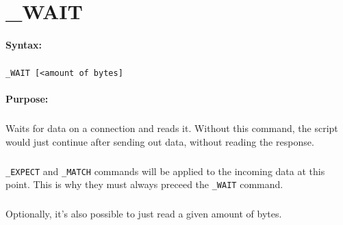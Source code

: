 
\newpage
\section{\_WAIT}
\label{cmd:_WAIT}

\paragraph{Syntax:}
\subparagraph{}
\texttt{\_WAIT [<amount of bytes]}

\paragraph{Purpose:}
\subparagraph{}
Waits for data on a connection and reads it. Without this 
command, the script would just continue after sending out 
data, without reading the response.

\subparagraph{}
\texttt{\_EXPECT} and \texttt{\_MATCH} commands will be 
applied to the incoming data at this point. This is why 
they must always preceed the \texttt{\_WAIT} command. 

\subparagraph{}
Optionally, it's also possible to just read a given amount 
of bytes.